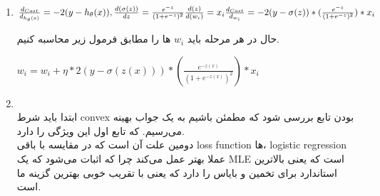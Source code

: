 \begin{enumerate}
  \item \phantom{text}
        \begin{latin}
          $\frac{d_{Cost}}{d_{h_\theta(x)}} = -2(y-h_\theta(x)),
          \\
          \frac{d(\sigma(z))}{dz} = \frac{e^{-z}}{(1+e^{-z})^2}
          \\
          \frac{d(z)}{d(w_i)} = x_i
          \\
          \frac{d_{Cost}}{d_{w_i}}=-2(y-\sigma(z))*( \frac{e^{-z}}{(1+e^{-z})^2}) * x_i$
        \end{latin}
        حال در هر مرحله باید $w_i$ ها را مطابق فرمول زیر محاسبه کنیم.
        \\
        \begin{latin}
          $w_i = w_i + \eta *2(y-\sigma(z(x)))*( \frac{e^{-z(x)}}{(1+e^{-z(x)})^2}) * x_i$
        \end{latin}
        \item \phantom{text}
        \\
        ابتدا باید شرط convex بودن تابع بررسی شود که مطمئن باشیم به یک جواب بهینه می‌رسیم.
        که تابع اول این ویژگی را دارد. 
        \\
        دومین علت آن است که در مقایسه با باقی loss function ها،‌ logistic regression عملا بهتر عمل می‌کند چرا که اثبات می‌شود که یک MLE است که یعنی بالاترین استاندارد برای تخمین و بایاس را دارد که یعنی با تقریب خوبی بهترین گزینه ما است.
\end{enumerate}
